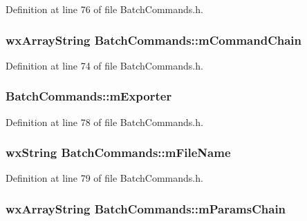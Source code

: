 Definition at line 76 of file Batch\+Commands.\+h.

\subsubsection[{\texorpdfstring{m\+Command\+Chain}{mCommandChain}}]{\setlength{\rightskip}{0pt plus 5cm}wx\+Array\+String Batch\+Commands\+::m\+Command\+Chain}\hypertarget{class_batch_commands_a692e3da8d53f0f6e96fff2a762d36030}{}\label{class_batch_commands_a692e3da8d53f0f6e96fff2a762d36030}


Definition at line 74 of file Batch\+Commands.\+h.

\subsubsection[{\texorpdfstring{m\+Exporter}{mExporter}}]{ Batch\+Commands\+::m\+Exporter}\hypertarget{class_batch_commands_afcbf772d7e4849302141eccfcf5874ce}{}\label{class_batch_commands_afcbf772d7e4849302141eccfcf5874ce}


Definition at line 78 of file Batch\+Commands.\+h.

\subsubsection[{\texorpdfstring{m\+File\+Name}{mFileName}}]{\setlength{\rightskip}{0pt plus 5cm}wx\+String Batch\+Commands\+::m\+File\+Name}\hypertarget{class_batch_commands_a3149a962faa40188807249b091089c6e}{}\label{class_batch_commands_a3149a962faa40188807249b091089c6e}


Definition at line 79 of file Batch\+Commands.\+h.

\subsubsection[{\texorpdfstring{m\+Params\+Chain}{mParamsChain}}]{\setlength{\rightskip}{0pt plus 5cm}wx\+Array\+String Batch\+Commands\+::m\+Params\+Chain}\hypertarget{class_batch_commands_ac462b94f6422cae948ad4fc809ced592}{}\label{class_batch_commands_ac462b94f6422cae948ad4fc809ced592}


